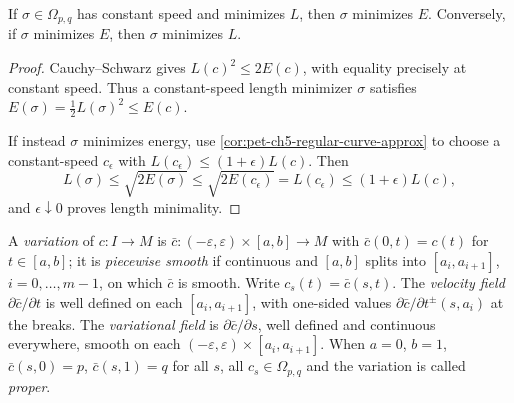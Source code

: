 \begin{proposition}
  \label{prop:pet-ch5-energy-length-minimizers}


  If $\sigma\in\Omega_{p,q}$ has constant speed and minimizes $L$, then $\sigma$
  minimizes $E$. Conversely, if $\sigma$ minimizes $E$, then $\sigma$ minimizes $L$.
\end{proposition}
\begin{proof}

  \sketch
  Cauchy--Schwarz gives $L(c)^2\le2E(c)$, with equality precisely at constant
  speed.  Thus a constant-speed length minimizer $\sigma$ satisfies
  $E(\sigma)=\tfrac12L(\sigma)^2\le E(c)$.

  If instead $\sigma$ minimizes energy, use
  \cref{cor:pet-ch5-regular-curve-approx} to choose a constant-speed $c_\epsilon$
  with $L(c_\epsilon)\le(1+\epsilon)L(c)$. Then
  \[
    L(\sigma)\le\sqrt{2E(\sigma)}\le\sqrt{2E(c_\epsilon)}=L(c_\epsilon)\le(1+\epsilon)L(c),
  \]
  and $\epsilon\downarrow0$ proves length minimality.
\end{proof}

\begin{definition}
  \label{def:pet-ch5-variation}


  A \emph{variation} of $c:I\to M$ is $\bar c:(-\varepsilon,\varepsilon)\times[a,b]\to
  M$ with $\bar c(0,t)=c(t)$ for $t\in[a,b]$; it is \emph{piecewise smooth} if
  continuous and $[a,b]$ splits into $[a_i,a_{i+1}]$, $i=0,\dots,m-1$, on which
  $\bar c$ is smooth. Write $c_s(t)=\bar c(s,t)$. The \emph{velocity field}
  $\partial\bar c/\partial t$ is well defined on each $[a_i,a_{i+1}]$, with one-sided
  values $\partial\bar c/\partial t^\pm(s,a_i)$ at the breaks. The \emph{variational
  field} is $\partial\bar c/\partial s$, well defined and continuous everywhere,
  smooth on each $(-\varepsilon,\varepsilon)\times[a_i,a_{i+1}]$. When $a=0$, $b=1$,
  $\bar c(s,0)=p$, $\bar c(s,1)=q$ for all $s$, all $c_s\in\Omega_{p,q}$ and the
  variation is called \emph{proper}.
\end{definition}

